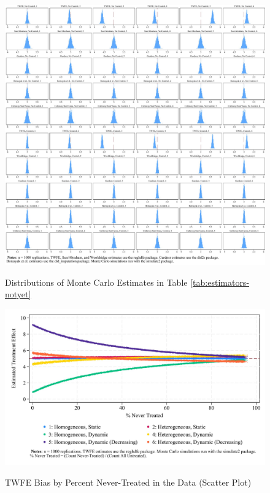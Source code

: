 \documentclass[12pt]{article}
\begin{document}
\begin{figure}[H]
    \centering
    \caption{Distributions of Monte Carlo Estimates in Table \ref{tab:estimators-notyet}}
    \includegraphics[width=6in]{Figures/Histograms of Monte Carlo Estimates 2.jpg}
    \label{fig:hist2}
\end{figure}

\begin{figure}
    \centering
    \caption{TWFE Bias by Percent Never-Treated in the Data (Scatter Plot)}
    \includegraphics[width=6in]{Figures/TWFE Bias by Percent Never Treated Scatter.jpg}
    \label{fig:scatter-nevertreat}
\end{figure}
\end{document}
